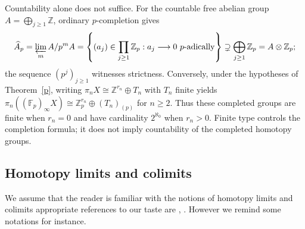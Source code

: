 \documentclass[11pt,a4paper]{article}
\begin{document}
Countability alone does not suffice.  For the countable free abelian group
$A=\bigoplus_{j\geq1}\mathbb Z$, ordinary $p$-completion gives
\[
 \widehat A_p=\varprojlim_m A/p^mA
 =\left\{(a_j)\in\prod_{j\geq1}\mathbb Z_p:
       a_j\longrightarrow0\text{ $p$-adically}\right\}
 \supsetneq\bigoplus_{j\geq1}\mathbb Z_p=A\otimes\mathbb Z_p;
\]
the sequence $(p^j)_{j\geq1}$ witnesses strictness.
Conversely, under the hypotheses of Theorem~\ref{p}, writing
$\pi_nX\cong\mathbb Z^{r_n}\oplus T_n$ with $T_n$ finite yields
$\pi_n((\mathbb F_p)_\infty X)\cong
\mathbb Z_p^{r_n}\oplus(T_n)_{(p)}$ for $n\geq2$.
Thus these completed groups are finite when $r_n=0$ and have cardinality
$2^{\aleph_0}$ when $r_n>0$.  Finite type controls the completion
formula; it does not imply countability of the completed homotopy groups.

\subsection{Homotopy limits and colimits}\label{Holim} 
We assume that the reader is familiar with the notions of homotopy limits and colimits appropriate references to our taste are \cite{MV}, \cite{Hir2}.
However we remind some notations for instance.
\end{document}
